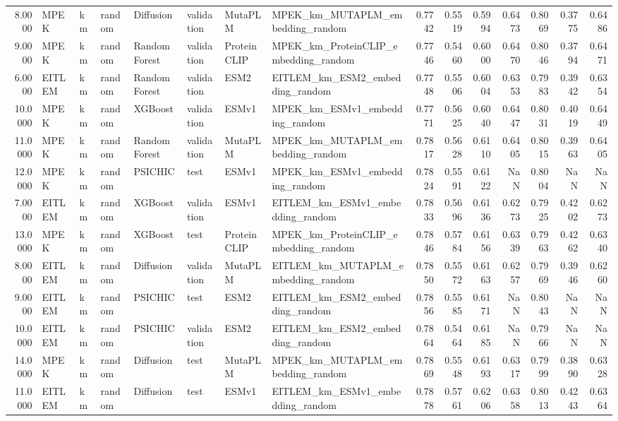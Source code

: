 \begin{tabular}{rlllllllrrrrrrr}
8.0000 & MPEK & km & random & Diffusion & validation & MutaPLM & MPEK_km_MUTAPLM_embedding_random & 0.7742 & 0.5519 & 0.5994 & 0.6473 & 0.8069 & 0.3775 & 0.6486 \\
9.0000 & MPEK & km & random & Random Forest & validation & ProteinCLIP & MPEK_km_ProteinCLIP_embedding_random & 0.7746 & 0.5460 & 0.6000 & 0.6470 & 0.8046 & 0.3794 & 0.6471 \\
6.0000 & EITLEM & km & random & Random Forest & validation & ESM2 & EITLEM_km_ESM2_embedding_random & 0.7748 & 0.5506 & 0.6004 & 0.6353 & 0.7983 & 0.3942 & 0.6354 \\
10.0000 & MPEK & km & random & XGBoost & validation & ESMv1 & MPEK_km_ESMv1_embedding_random & 0.7771 & 0.5625 & 0.6040 & 0.6447 & 0.8031 & 0.4019 & 0.6449 \\
11.0000 & MPEK & km & random & Random Forest & validation & MutaPLM & MPEK_km_MUTAPLM_embedding_random & 0.7817 & 0.5628 & 0.6110 & 0.6405 & 0.8015 & 0.3963 & 0.6405 \\
12.0000 & MPEK & km & random & PSICHIC & test & ESMv1 & MPEK_km_ESMv1_embedding_random & 0.7824 & 0.5591 & 0.6122 & NaN & 0.8004 & NaN & NaN \\
7.0000 & EITLEM & km & random & XGBoost & validation & ESMv1 & EITLEM_km_ESMv1_embedding_random & 0.7833 & 0.5696 & 0.6136 & 0.6273 & 0.7925 & 0.4202 & 0.6273 \\
13.0000 & MPEK & km & random & XGBoost & test & ProteinCLIP & MPEK_km_ProteinCLIP_embedding_random & 0.7846 & 0.5784 & 0.6156 & 0.6339 & 0.7963 & 0.4262 & 0.6340 \\
8.0000 & EITLEM & km & random & Diffusion & validation & MutaPLM & EITLEM_km_MUTAPLM_embedding_random & 0.7850 & 0.5572 & 0.6163 & 0.6257 & 0.7969 & 0.3946 & 0.6260 \\
9.0000 & EITLEM & km & random & PSICHIC & test & ESM2 & EITLEM_km_ESM2_embedding_random & 0.7856 & 0.5585 & 0.6171 & NaN & 0.8043 & NaN & NaN \\
10.0000 & EITLEM & km & random & PSICHIC & validation & ESM2 & EITLEM_km_ESM2_embedding_random & 0.7864 & 0.5464 & 0.6185 & NaN & 0.7966 & NaN & NaN \\
14.0000 & MPEK & km & random & Diffusion & test & MutaPLM & MPEK_km_MUTAPLM_embedding_random & 0.7869 & 0.5548 & 0.6193 & 0.6317 & 0.7999 & 0.3890 & 0.6328 \\
11.0000 & EITLEM & km & random & Diffusion & test & ESMv1 & EITLEM_km_ESMv1_embedding_random & 0.7878 & 0.5761 & 0.6206 & 0.6358 & 0.8013 & 0.4243 & 0.6364 \\

\end{tabular}
